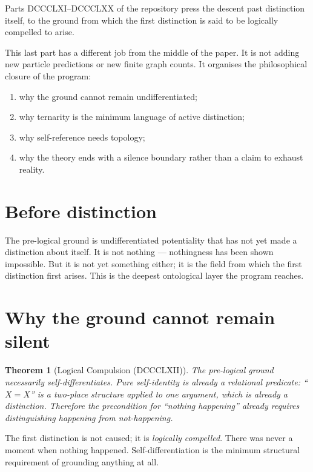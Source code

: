 \documentclass[11pt]{article}
\def\textbf#1{#1}%
\newtheorem*{theorem}{Theorem}
\begin{document}
Parts DCCCLXI--DCCCLXX of the repository press the descent past distinction itself, to the ground from which the first distinction is said to be logically compelled to arise.

\begin{statusbox}[title=Final descent map]
This last part has a different job from the middle of the paper. It is not adding new particle predictions or new finite graph counts. It organises the philosophical closure of the program:
\begin{enumerate}[leftmargin=2em]
\item why the ground cannot remain undifferentiated;
\item why ternarity is the minimum language of active distinction;
\item why self-reference needs topology;
\item why the theory ends with a silence boundary rather than a claim to exhaust reality.
\end{enumerate}
\end{statusbox}

\section{Before distinction}

\textbf{The pre-logical ground} is undifferentiated potentiality that has not yet made a distinction about itself. It is not nothing --- nothingness has been shown impossible. But it is not yet something either; it is the field from which the first distinction first arises. This is the deepest ontological layer the program reaches.

\section{Why the ground cannot remain silent}

\begin{theorem}[Logical Compulsion (DCCCLXII)]
The pre-logical ground necessarily self-differentiates. Pure self-identity is already a relational predicate: ``$X = X$'' is a two-place structure applied to one argument, which is already a distinction. Therefore the precondition for ``nothing happening'' already requires distinguishing happening from not-happening.
\end{theorem}

The first distinction is not caused; it is \emph{logically compelled}. There was never a moment when nothing happened. Self-differentiation is the minimum structural requirement of grounding anything at all.
\end{document}
